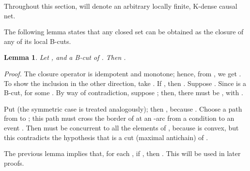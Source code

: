 \documentclass{eptcs}
\newenvironment{proof}{\textit{Proof.}\quad}{\par\vspace{\baselineskip}\relax}
\newtheorem{lemma}{Lemma}
\begin{document}
Throughout this section,  will denote an
arbitrary locally finite, K-dense causal net.

The following lemma states that any closed set can be
obtained as the closure of any of its local B-cuts.
\begin{lemma}\label{l:tagliechiusi}
  Let , and  a B-cut of .
  Then .
\end{lemma}
\begin{proof}
  The closure operator is idempotent and monotone;
  hence, from ,
  we get . To show the inclusion in the
  other direction, take . If , then .
  Suppose . Since  is a B-cut,  for some
  . By way of contradiction, suppose ;
  then, there must be , with .

  Put  (the symmetric case is treated analogously); then ,
  because . Choose a path from  to ; this path must cross
  the border of  at an -arc from a condition  to an event .
  Then  must be concurrent to all the elements of , because  is convex,
  but this contradicts the hypothesis that  is a cut (maximal
  antichain) of .
\end{proof}
The previous lemma implies that, for each ,
if , then . This will be used in later proofs.
\end{document}
